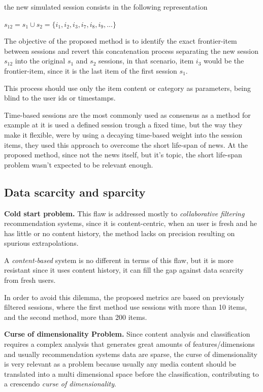 \documentclass[ecp,tc,english]{iiufrgs}
\begin{document}
        the new simulated session consists in the following representation
    
        \(s_{12} =  s_{1} \cup  s_{2} =  \{i_{1}, i_{2}, i_{3}, i_{7}, i_{8}, i_{9}, ...\}\)
    
        The objective of the proposed method is to identify the exact frontier-item between sessions and revert this concatenation process separating the new session  \(s_{12}\) into the original \(s_{1}\) and \(s_{2}\) sessions, in that scenario, item \(i_{3}\) would be the frontier-item, since it is the last item of the first session \(s_{1}\).
    
        This process should use only the item content or category as parameters, being blind to the user ids or timestamps.
        
        Time-based sessions are the most commonly used as consensus as a method for example at \cite{sottocornola2018} it is used a defined session trough a fixed time, but the way they make it flexible, were by using a decaying time-based weight into the session items, they used this approach to overcome the short life-span of news. At the proposed method, since not the news itself, but it's topic, the short life-span problem wasn't expected to be relevant enough.
    
        \subsection{Data scarcity and sparcity} \label{data_scarcity_and_sparcity}
        \textbf{Cold start problem.} This flaw is addressed mostly to \textit{collaborative filtering} recommendation systems, since it is content-centric, when an user is fresh and he has little or no content history, the method lacks on precision resulting on spurious extrapolations.
    
        A \textit{content-based} system is no different in terms of this flaw, but it is more resistant since it uses content history, it can fill the gap against data scarcity from fresh users.
        
        In order to avoid this dilemma, the proposed metrics are based on previously filtered sessions, where the first method use sessions with more than 10 items, and the second method, more than 200 items.
    
        \textbf{Curse of dimensionality Problem.} Since content analysis and classification requires a complex analysis that generates great amounts of features/dimensions and usually recommendation systems data are sparse, the curse of dimensionality \cite{marimont1979} is very relevant as a problem because usually any media content should be translated into a multi dimensional space before the classification, contributing to a crescendo \textit{curse of dimensionality}.
\end{document}
